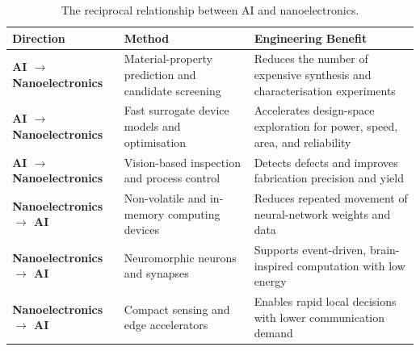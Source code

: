 \begin{table}[b]
\centering
\caption{The reciprocal relationship between AI and nanoelectronics.}
\footnotesize
  \setlength{\tabcolsep}{4pt}
  \renewcommand{\arraystretch}{1.25}
  \begin{tabular}{@{}>{\bfseries\RaggedRight\arraybackslash}p{}
                      >{\RaggedRight\arraybackslash}p{}
                      >{\RaggedRight\arraybackslash}p{}@{}}
    \toprule
    \textbf{Direction} & \textbf{Method} & \textbf{Engineering Benefit} \\
    \midrule
    AI $\rightarrow$ Nanoelectronics & Material-property prediction and candidate screening & Reduces the number of expensive synthesis and characterisation experiments \\
    AI $\rightarrow$ Nanoelectronics & Fast surrogate device models and optimisation & Accelerates design-space exploration for power, speed, area, and reliability \\
    AI $\rightarrow$ Nanoelectronics & Vision-based inspection and process control & Detects defects and improves fabrication precision and yield \\
    Nanoelectronics $\rightarrow$ AI & Non-volatile and in-memory computing devices & Reduces repeated movement of neural-network weights and data \\
    Nanoelectronics $\rightarrow$ AI & Neuromorphic neurons and synapses & Supports event-driven, brain-inspired computation with low energy \\
    Nanoelectronics $\rightarrow$ AI & Compact sensing and edge accelerators & Enables rapid local decisions with lower communication demand \\
    \bottomrule
  \end{tabular}
\end{table}
\vspace{-0.18em}

